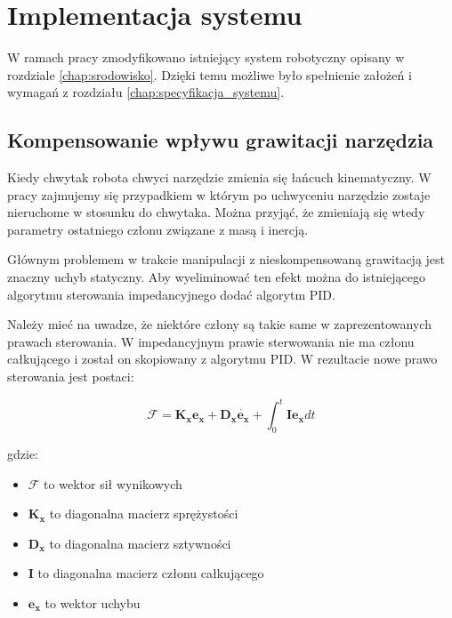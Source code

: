 
\chapter{Implementacja systemu\label{chap:implementacja_systemu}}
W ramach pracy zmodyfikowano istniejący system robotyczny opisany w rozdziale \ref{chap:srodowisko}. Dzięki temu możliwe było spełnienie założeń i wymagań z rozdziału \ref{chap:specyfikacja_systemu}. 


\section{Kompensowanie wpływu grawitacji narzędzia}
Kiedy chwytak robota chwyci narzędzie zmienia się łańcuch kinematyczny. W pracy zajmujemy się przypadkiem w którym po uchwyceniu narzędzie zostaje nieruchome w stosunku do chwytaka. Można przyjąć, że zmieniają się wtedy parametry ostatniego członu związane z masą i inercją.

Głównym problemem w trakcie manipulacji z nieskompensowaną grawitacją jest znaczny uchyb statyczny. Aby wyeliminować ten efekt można do istniejącego algorytmu sterowania impedancyjnego dodać algorytm PID. 

Należy mieć na uwadze, że niektóre człony są takie same w zaprezentowanych prawach sterowania. W impedancyjnym prawie sterwowania nie ma członu całkującego i został on skopiowany z algorytmu PID. W rezultacie nowe prawo sterowania jest postaci:

\begin{equation}
\boldsymbol{\mathcal{F}} = \boldsymbol{K_x}\boldsymbol{e_x} + \boldsymbol{D_x}\dot{\boldsymbol{e_x}} + \int_{0}^{t}  \boldsymbol{I}\boldsymbol{e_x}dt
\end{equation}

gdzie:
\begin{itemize}
    \item $\boldsymbol{\mathcal{F}}$ to wektor sił wynikowych
    \item $\boldsymbol{K_x}$ to diagonalna macierz sprężystości
    \item $\boldsymbol{D_x}$ to diagonalna macierz sztywności
    \item $\boldsymbol{I}$ to diagonalna macierz członu całkującego
    \item $\boldsymbol{e_x}$ to wektor uchybu
\end{itemize}